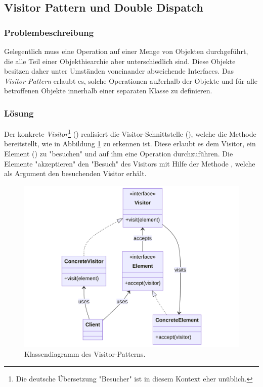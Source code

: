 \subsection{Visitor Pattern und Double Dispatch}


\subsubsection*{Problembeschreibung}

Gelegentlich muss eine Operation auf einer Menge von Objekten durchgeführt, die alle Teil einer Objekthiearchie aber unterschiedlich sind. Diese Objekte besitzen daher unter Umständen voneinander abweichende Interfaces. Das \emph{Visitor-Pattern} erlaubt es, solche Operationen außerhalb der Objekte und für alle betroffenen Objekte innerhalb einer separaten Klasse zu definieren. \cite{gamma_design_1995}

\subsubsection*{Lösung}

Der konkrete \emph{Visitor}\footnote{Die deutsche Übersetzung "Besucher" ist in diesem Kontext eher unüblich.} () realisiert die Visitor-Schnittstelle (), welche die Methode  bereitstellt, wie in Abbildung \ref{fig:visitor-class} zu erkennen ist. Diese erlaubt es dem Visitor, ein Element () zu "besuchen" und auf ihm eine Operation durchzuführen. Die Elemente "akzeptieren" den "Besuch" des Visitors mit Hilfe der Methode , welche als Argument den besuchenden Visitor erhält.

\begin{figure}[htb]
	\centering
	\includegraphics[width=0.75\linewidth]{images/patterns/visitor-class.png}
	\caption{Klassendiagramm des Visitor-Patterns. \cite{skobeleva_visitor_2023}}
	\label{fig:visitor-class}
\end{figure}

